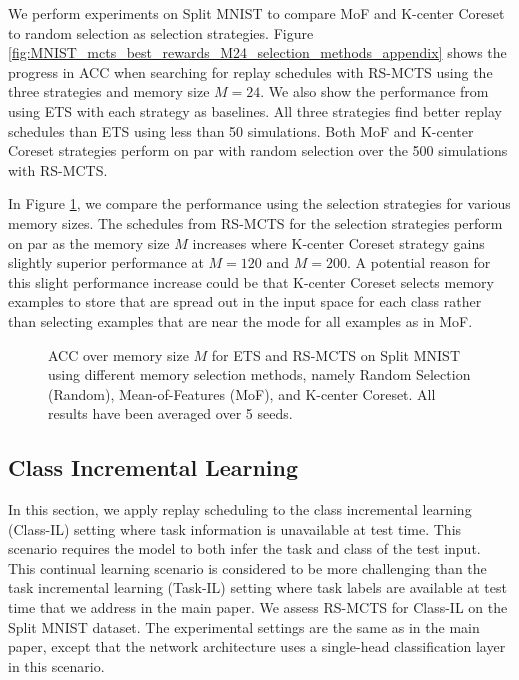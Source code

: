 We perform experiments on Split MNIST to compare MoF and K-center Coreset to random selection as selection strategies. Figure \ref{fig:MNIST_mcts_best_rewards_M24_selection_methods_appendix} shows the progress in ACC when searching for replay schedules with RS-MCTS using the three strategies and memory size $M=24$. We also show the performance from using ETS with each strategy as baselines. All three strategies find better replay schedules than ETS using less than 50 simulations. Both MoF and K-center Coreset strategies perform on par with random selection over the 500 simulations with RS-MCTS. 

In Figure \ref{fig:MNIST_ACC_over_M_selection_methods_appendix}, we compare the performance using the selection strategies for various memory sizes. The schedules from RS-MCTS for the selection strategies perform on par as the memory size $M$ increases where K-center Coreset strategy gains slightly superior performance at $M=120$ and $M=200$. A potential reason for this slight performance increase could be that K-center Coreset selects memory examples to store that are spread out in the input space for each class rather than selecting examples that are near the mode for all examples as in MoF.   



\begin{figure}[t]
  \centering
  \setlength{\figwidth}{0.6\textwidth}
  \setlength{\figheight}{0.4\textwidth}
  
  \caption{ACC over memory size $M$ for ETS and RS-MCTS on Split MNIST using different memory selection methods, namely Random Selection (Random), Mean-of-Features (MoF), and K-center Coreset. All results have been averaged over 5 seeds. 
  }\vspace{-6mm}
  \label{fig:MNIST_ACC_over_M_selection_methods_appendix}
\end{figure}

\subsection{Class Incremental Learning}\label{app:class_incremental_learning}

In this section, we apply replay scheduling to the class incremental learning (Class-IL) setting where task information is unavailable at test time. This scenario requires the model to both infer the task and class of the test input. This continual learning scenario is considered to be more challenging than the task incremental learning (Task-IL) setting where task labels are available at test time that we address in the main paper. We assess RS-MCTS for Class-IL on the Split MNIST dataset. The experimental settings are the same as in the main paper, except that the network architecture uses a single-head classification layer in this scenario. 

